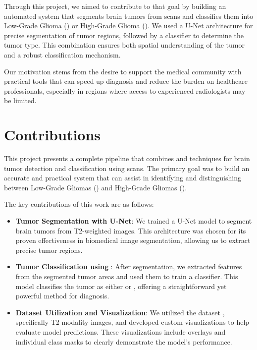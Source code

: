 Through this project, we aimed to contribute to that goal by building an automated system that segments brain tumors from  scans and classifies them into Low-Grade Glioma () or High-Grade Glioma (). We used a U-Net architecture for precise segmentation of tumor regions, followed by a  classifier to determine the tumor type. This combination ensures both spatial understanding of the tumor and a robust classification mechanism.

Our motivation stems from the desire to support the medical community with practical  tools that can speed up diagnosis and reduce the burden on healthcare professionals, especially in regions where access to experienced radiologists may be limited.

\section{ Contributions }

This project presents a complete pipeline that combines  and  techniques for brain tumor detection and classification using  scans. The primary goal was to build an accurate and practical system that can assist in identifying and distinguishing between Low-Grade Gliomas () and High-Grade Gliomas ().

The key contributions of this work are as follows:

\begin{itemize}
	\item \textbf{Tumor Segmentation with U-Net}: We  trained a U-Net model to segment brain tumors from T2-weighted  images. This architecture was chosen for its proven effectiveness in biomedical image segmentation, allowing us to extract precise tumor regions. \cite{ronneberger2015u}
	\item \textbf{Tumor Classification using }: After segmentation, we extracted features from the segmented tumor areas and used them to train a  classifier. This model classifies the tumor as either  or , offering a straightforward yet powerful method for diagnosis.
	\item \textbf{Dataset Utilization and Visualization}: We utilized the  dataset \cite{brats2020}, specifically T2 modality images, and developed custom visualizations to help evaluate model predictions. These visualizations include overlays and individual class masks to clearly demonstrate the model's performance.
\end{itemize}
